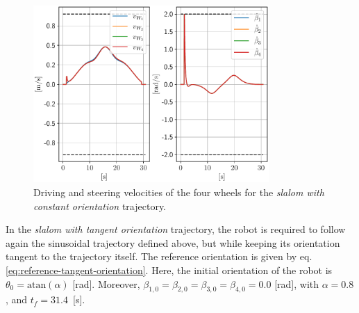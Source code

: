 \begin{figure}
    \centering
    \includegraphics[width=0.8\textwidth]{figures/SWMR/simulations/slalom_with_constant_orientation/wheels_velocities.pdf}
    \caption{Driving and steering velocities of the four wheels for the \textit{slalom with constant orientation} trajectory.}
    \label{fig:simulations:slalom-with-constant-orientation:wheel-velocities}
\end{figure}

In the \textit{slalom with tangent orientation} trajectory, the robot is required to follow again the sinusoidal trajectory defined above, but while keeping its orientation tangent to the trajectory itself. The reference orientation is given by eq. \eqref{eq:reference-tangent-orientation}.
Here, the initial orientation of the robot is $\theta_0=\mathrm{atan}(\alpha)$ [rad]. Moreover, $\beta_{1,0}=\beta_{2,0}=\beta_{3,0}=\beta_{4,0}=0.0$ [rad], with $\alpha=0.8$, and $t_f=31.4$~[s].


